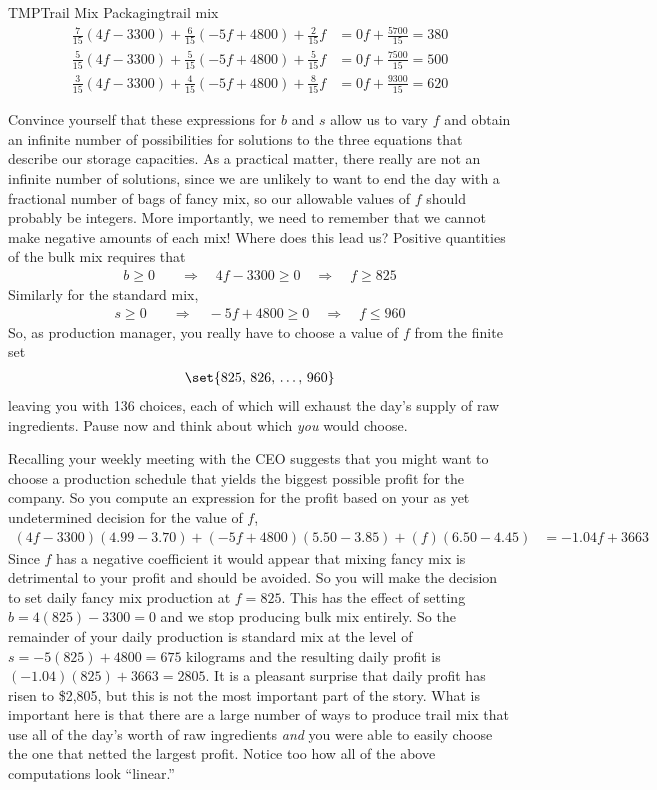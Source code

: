 \begin{example}{TMP}{Trail Mix Packaging}{trail mix}
%
\begin{align*}
\frac{7}{15}(4f-3300)+\frac{6}{15}(-5f+4800)+\frac{2}{15}f&=0f+\frac{5700}{15}=380\\
\frac{5}{15}(4f-3300)+\frac{5}{15}(-5f+4800)+\frac{5}{15}f&=0f+\frac{7500}{15}=500\\
\frac{3}{15}(4f-3300)+\frac{4}{15}(-5f+4800)+\frac{8}{15}f&=0f+\frac{9300}{15}=620
\end{align*}\par
%
Convince yourself that these expressions for $b$ and $s$ allow us to vary $f$ and obtain an infinite number of possibilities for solutions to the three equations that describe our storage capacities.  As a practical matter, there really are not an infinite number of solutions, since we are unlikely to want to end the day with a fractional number of bags of fancy mix, so our allowable values of $f$ should probably be integers.  More importantly, we need to remember that we cannot make negative amounts of each mix!  Where does this lead us?   Positive quantities of the bulk mix requires that
%
\begin{align*}
b\geq 0
&\quad\Rightarrow\quad 4f-3300\geq 0
\quad\Rightarrow\quad f\geq 825
\end{align*}
%
Similarly for the standard mix,
%
\begin{align*}
s\geq 0
&\quad\Rightarrow\quad -5f+4800\geq 0
\quad\Rightarrow\quad f\leq 960
\end{align*}
%
So, as production manager, you really have to choose a value of $f$ from the finite set \begin{align*}
\set{825,\,826,\,\ldots,\,960}
\end{align*}
leaving you with 136 choices, each of which will exhaust the day's supply of raw ingredients.  Pause now and think about which {\em you} would choose.\par
%
Recalling your weekly meeting with the CEO suggests that you might want to choose a production schedule that yields the biggest possible profit for the company.  So you compute an expression for the profit based on your as yet undetermined decision for the value of $f$,
%
\begin{align*}
(4f-3300)(4.99-3.70)+(-5f+4800)(5.50-3.85)+(f)(6.50-4.45)&=-1.04f + 3663
\end{align*}
%
Since $f$ has a negative coefficient it would appear that mixing fancy mix is detrimental to your profit and should be avoided.  So you will make the decision to set daily fancy mix production at $f=825$.  This has the effect of setting $b=4(825)-3300=0$ and we stop producing bulk mix entirely.  So the remainder of your daily production is standard mix at the level of $s=-5(825)+4800=675$ kilograms and the resulting daily profit is $(-1.04)(825)+3663=2805$.  It is a pleasant surprise that daily profit has risen to \$2,805, but this is not the most important part of the story.  What is important here is that there are a large number of ways to produce trail mix that use all of the day's worth of raw ingredients {\em and} you were able to easily choose the one that netted the largest profit.  Notice too how all of the above computations look ``linear.''\par

\end{example}
